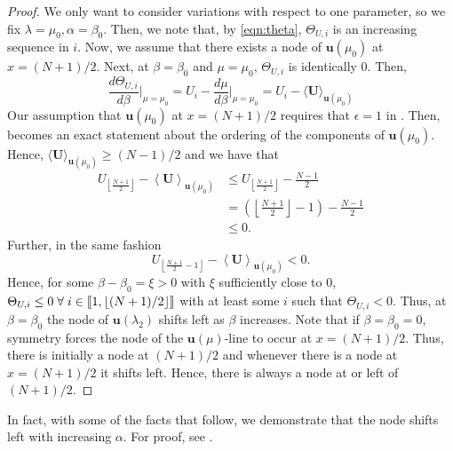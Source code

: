     \begin{proof}
    We only want to consider variations with respect to one parameter, so we fix $\lambda=\mu_0,\alpha=\beta_0$. Then, we note that, by \cref{eqn:theta}, $\Theta_{U,i}$ is an increasing sequence in $i$. Now, we assume that there exists a node of $\mathbf{u}(\mu_0)$ at $x=(N+1)/2$. Next, at $\beta=\beta_0$ and $\mu=\mu_0$, $\Theta_{U,i}$ is identically $0$. Then,
      \begin{equation}\label{eq:theta_vary}
	\frac{d \Theta_{U,i}}{d\beta}\bigg\rvert_{\mu=\mu_0} = U_i - \frac{d \mu}{d \beta}\bigg\rvert_{\mu=\mu_0}= U_i - \langle \mathbf{U} \rangle_{\mathbf{u}(\mu_0)}
      \end{equation}
      Our assumption that $\mathbf{u}(\mu_0)$ at $x=(N+1)/2$ requires that $\epsilon=1$ in . Then,  becomes an exact statement about the ordering of the components of $\mathbf{u}(\mu_0)$. Hence, $\langle \mathbf{U}\rangle_{\mathbf{u}(\mu_0)} \geq (N-1)/2$ and we have that
      \begin{align}\label{eq:node_theta}
	U_{\left\lfloor\frac{N+1}{2}\right\rfloor} - \left\langle \mathbf{U} \right\rangle_{\mathbf{u}(\mu_0)} &\leq U_{\left\lfloor\frac{N+1}{2}\right\rfloor} - \frac{N-1}{2} \\
	&= \left(\left\lfloor\frac{N+1}{2}\right\rfloor - 1\right) - \frac{N-1}{2} \\
	&\leq 0.
      \end{align}
      Further, in the same fashion
      \begin{equation}
      	U_{\left\lfloor\frac{N+1}{2}-1\right\rfloor} - \left\langle \mathbf{U} \right\rangle_{\mathbf{u}(\mu_0)} < 0.
      \end{equation}
      Hence, for some $\beta-\beta_0=\xi>0$ with $\xi$ sufficiently close to 0, $\Theta_{U,i}\leq0 \; \forall \; i \in \left \llbracket 1 , \lfloor(N+1)/2\rfloor \right \rrbracket$ with at least some $i$ such that $\Theta_{U,i}<0$. Thus, at $\beta=\beta_0$ the node of $\mathbf{u}(\lambda_2)$ shifts left as $\beta$ increases. Note that if $\beta=\beta_0=0$, symmetry forces the node of the $\mathbf{u}(\mu)$-line to occur at $x=(N+1)/2$. Thus, there is initially a node at $(N+1)/2$ and whenever there is a node at $x=(N+1)/2$ it shifts left. Hence, there is always a node at or left of $(N+1)/2$.
    \end{proof}

    \begin{remark}
    	In fact, with some of the facts that follow, we demonstrate that the node shifts left with increasing $\alpha$. For proof, see .
    \end{remark}

